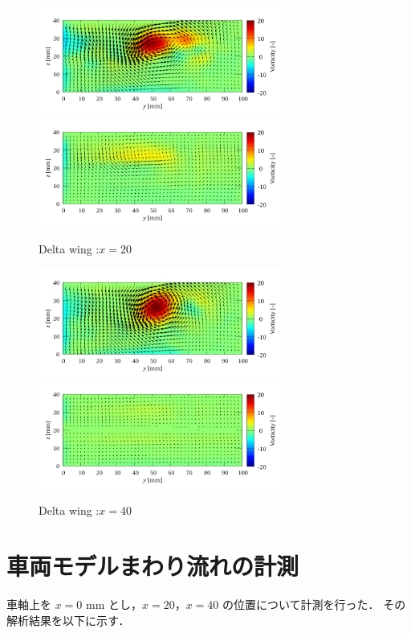 \documentclass[twocolumn,a4j]{jsarticle}
\begin{document}
\newpage
\begin{figure}[htbp]
  \centering
  {
    \includegraphics[keepaspectratio, width=80mm]{../images/Simulation/Compare/experiment_x=20.png}
    \includegraphics[keepaspectratio, width=80mm]{../images/Simulation/Compare/simulation_x=20.png}
  }
  \caption{Delta wing :$x=20$}
  {
    \includegraphics[keepaspectratio, width=80mm]{../images/Simulation/Compare/experiment_x=40.png}
    \includegraphics[keepaspectratio, width=80mm]{../images/Simulation/Compare/simulation_x=40.png}
  }
  \caption{Delta wing :$x=40$}
\end{figure}

\section{車両モデルまわり流れの計測}
車軸上を $x=0$ mm とし，$x=20$，$x=40$ の位置について計測を行った．
その解析結果を以下に示す．
\end{document}
